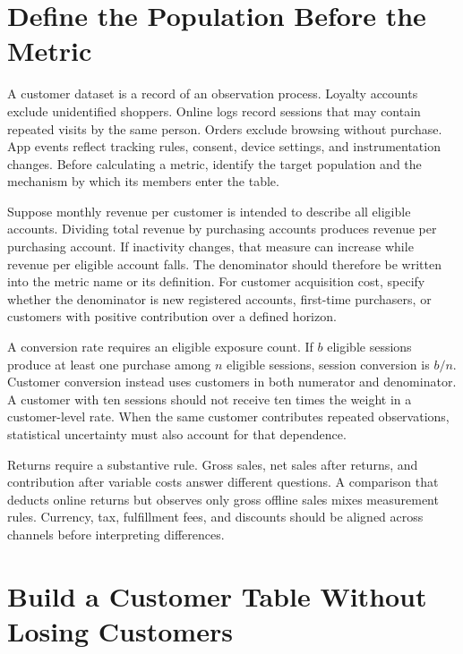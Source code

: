 \hypertarget{M02-define-the-population-before-the-metric}{%
\section{Define the Population Before the
Metric}\label{M02-define-the-population-before-the-metric}}

\noindent A customer dataset is a record of an observation process. Loyalty
accounts exclude unidentified shoppers. Online logs record sessions that
may contain repeated visits by the same person. Orders exclude browsing
without purchase. App events reflect tracking rules, consent, device
settings, and instrumentation changes. Before calculating a metric,
identify the target population and the mechanism by which its members
enter the table.

Suppose monthly revenue per customer is intended to describe all
eligible accounts. Dividing total revenue by purchasing accounts
produces revenue per purchasing account. If inactivity changes, that
measure can increase while revenue per eligible account falls. The
denominator should therefore be written into the metric name or its
definition. For customer acquisition cost, specify whether the
denominator is new registered accounts, first-time purchasers, or
customers with positive contribution over a defined horizon.

A conversion rate requires an eligible exposure count. If \(b\) eligible
sessions produce at least one purchase among \(n\) eligible sessions,
session conversion is \(b/n\). Customer conversion instead uses
customers in both numerator and denominator. A customer with ten
sessions should not receive ten times the weight in a customer-level
rate. When the same customer contributes repeated observations,
statistical uncertainty must also account for that dependence.

Returns require a substantive rule. Gross sales, net sales after
returns, and contribution after variable costs answer different
questions. A comparison that deducts online returns but observes only
gross offline sales mixes measurement rules. Currency, tax, fulfillment
fees, and discounts should be aligned across channels before
interpreting differences.

\hypertarget{M02-build-a-customer-table-without-losing-customers}{%
\section{Build a Customer Table Without Losing
Customers}\label{M02-build-a-customer-table-without-losing-customers}}

